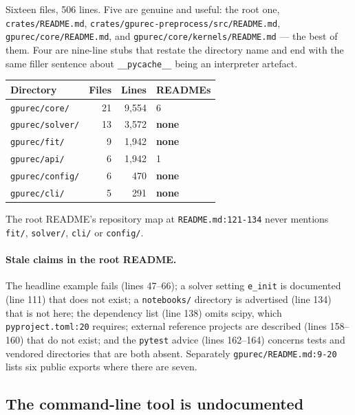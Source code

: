 \documentclass[11pt]{article}
\newcommand{\loc}[1]{\nolinkurl{#1}}
\newcommand{\dir}[1]{\nolinkurl{#1}}
\begin{document}
Sixteen files, 506 lines.  Five are genuine and useful: the root one,
\dir{crates/README.md}, \dir{crates/gpurec-preprocess/src/README.md},
\dir{gpurec/core/README.md}, and \dir{gpurec/core/kernels/README.md} --- the
best of them.  Four are nine-line stubs that restate the directory name and end
with the same filler sentence about \texttt{\_\_pycache\_\_} being an
interpreter artefact.

\begin{center}
\begin{tabular}{@{}lrrl@{}}
\toprule
Directory & Files & Lines & READMEs \\
\midrule
\dir{gpurec/core/}   & 21 & 9{,}554 & 6 \\
\dir{gpurec/solver/} & 13 & 3{,}572 & \textbf{none} \\
\dir{gpurec/fit/}    &  9 & 1{,}942 & \textbf{none} \\
\dir{gpurec/api/}    &  6 & 1{,}942 & 1 \\
\dir{gpurec/config/} &  6 &   470 & \textbf{none} \\
\dir{gpurec/cli/}    &  5 &   291 & \textbf{none} \\
\bottomrule
\end{tabular}
\end{center}

The root README's repository map at \loc{README.md:121-134} never mentions
\dir{fit/}, \dir{solver/}, \dir{cli/} or \dir{config/}.

\paragraph{Stale claims in the root README.}  The headline example fails
(lines 47--66); a solver setting \texttt{e\_init} is documented (line 111) that
does not exist; a \dir{notebooks/} directory is advertised (line 134) that is
not here; the dependency list (line 138) omits scipy, which
\loc{pyproject.toml:20} requires; external reference projects are described
(lines 158--160) that do not exist; and the \texttt{pytest} advice
(lines 162--164) concerns tests and vendored directories that are both absent.
Separately \loc{gpurec/README.md:9-20} lists six public exports where there are
seven.

\subsection{The command-line tool is undocumented}
\end{document}
